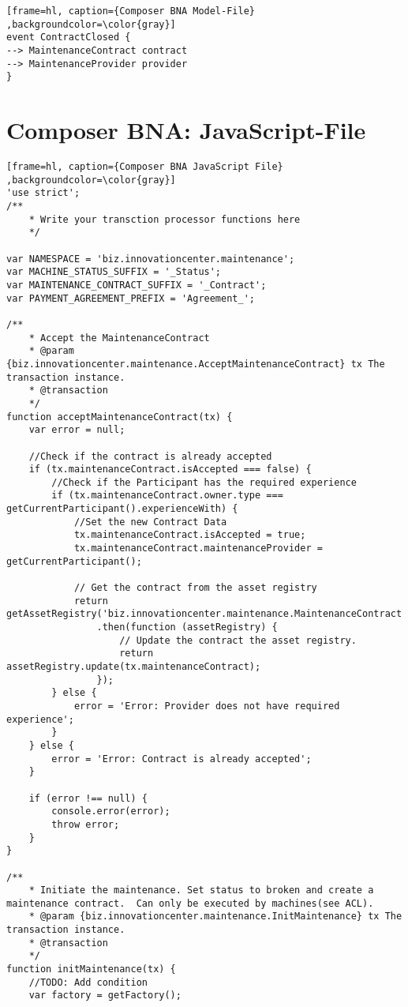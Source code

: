 \begin{appendices}
\begin{lstlisting}[frame=hl, caption={Composer BNA Model-File} ,backgroundcolor=\color{gray}]
event ContractClosed {
--> MaintenanceContract contract
--> MaintenanceProvider provider
}
\end{lstlisting}

\chapter{Composer BNA: JavaScript-File}
\label{append:javascript-file}

\begin{lstlisting}[frame=hl, caption={Composer BNA JavaScript File} ,backgroundcolor=\color{gray}]
'use strict';
/**
    * Write your transction processor functions here
    */

var NAMESPACE = 'biz.innovationcenter.maintenance';
var MACHINE_STATUS_SUFFIX = '_Status';
var MAINTENANCE_CONTRACT_SUFFIX = '_Contract';
var PAYMENT_AGREEMENT_PREFIX = 'Agreement_';

/**
    * Accept the MaintenanceContract
    * @param {biz.innovationcenter.maintenance.AcceptMaintenanceContract} tx The transaction instance.
    * @transaction
    */
function acceptMaintenanceContract(tx) {
    var error = null;

    //Check if the contract is already accepted
    if (tx.maintenanceContract.isAccepted === false) {
        //Check if the Participant has the required experience
        if (tx.maintenanceContract.owner.type === getCurrentParticipant().experienceWith) {
            //Set the new Contract Data
            tx.maintenanceContract.isAccepted = true;
            tx.maintenanceContract.maintenanceProvider = getCurrentParticipant();

            // Get the contract from the asset registry
            return getAssetRegistry('biz.innovationcenter.maintenance.MaintenanceContract')
                .then(function (assetRegistry) {
                    // Update the contract the asset registry.
                    return assetRegistry.update(tx.maintenanceContract);
                });
        } else {
            error = 'Error: Provider does not have required experience';
        }
    } else {
        error = 'Error: Contract is already accepted';
    }

    if (error !== null) {
        console.error(error);
        throw error;
    }
}

/**
    * Initiate the maintenance. Set status to broken and create a maintenance contract.  Can only be executed by machines(see ACL).
    * @param {biz.innovationcenter.maintenance.InitMaintenance} tx The transaction instance.
    * @transaction
    */
function initMaintenance(tx) {
    //TODO: Add condition
    var factory = getFactory();


\end{lstlisting}
\end{appendices}
